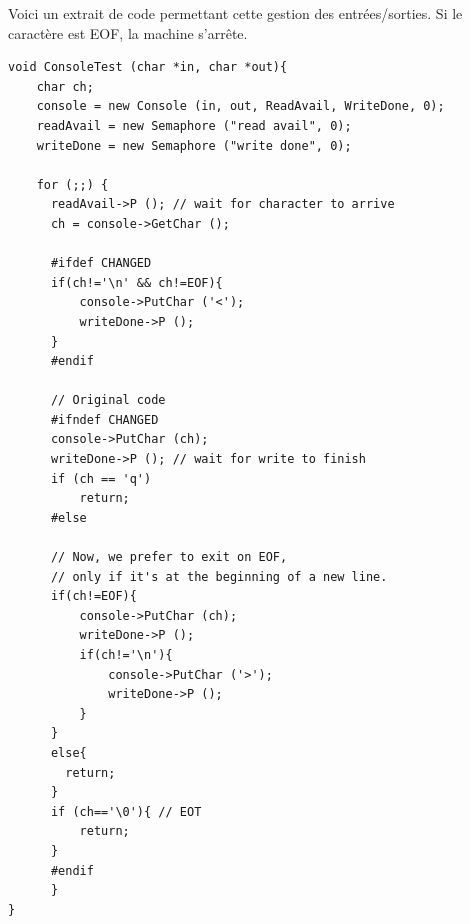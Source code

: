\documentclass[a4paper,10pt]{article}
\begin{document}
Voici un extrait de code permettant cette gestion des entrées/sorties. Si le caractère est EOF, la machine s'arrête.
\begin{lstlisting}[frame=single]
void ConsoleTest (char *in, char *out){
    char ch;
    console = new Console (in, out, ReadAvail, WriteDone, 0);
    readAvail = new Semaphore ("read avail", 0);
    writeDone = new Semaphore ("write done", 0);

    for (;;) {
	  readAvail->P (); // wait for character to arrive
	  ch = console->GetChar ();
	  
	  #ifdef CHANGED
	  if(ch!='\n' && ch!=EOF){
		  console->PutChar ('<');
		  writeDone->P ();
	  }
	  #endif
	  
	  // Original code
	  #ifndef CHANGED 
	  console->PutChar (ch);
	  writeDone->P (); // wait for write to finish
	  if (ch == 'q')
		  return;
	  #else
	  
	  // Now, we prefer to exit on EOF,
	  // only if it's at the beginning of a new line.
	  if(ch!=EOF){
		  console->PutChar (ch);
		  writeDone->P ();
		  if(ch!='\n'){
			  console->PutChar ('>');
			  writeDone->P ();
		  }
	  }
	  else{
		return;
	  }
	  if (ch=='\0'){ // EOT
		  return;
	  }
      #endif
      }
}
\end{lstlisting}
\newpage
\end{document}

